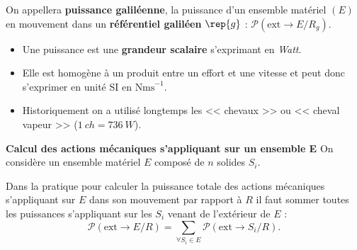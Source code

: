 \begin{remarque}%
On appellera \textbf{puissance galiléenne}, la puissance d'un ensemble matériel $(E)$ en mouvement dans un \textbf{référentiel galiléen} $\rep{g}$ : 
$
\mathcal{P}(\text{ext} \rightarrow E/R_g)
$.
\end{remarque}%


\begin{marginfigure}[-5cm]
\begin{itemize}
\item Une puissance est une \textbf{grandeur scalaire} s'exprimant en \textit{Watt}.
\item Elle est homogène à un produit entre un effort et une vitesse et peut donc s'exprimer en unité SI en $\text{Nms}^{-1}$.
\item Historiquement on a utilisé longtemps les << chevaux >> ou << cheval vapeur >> ($\SI{1}{ch}= \SI{736}{W}$).
\end{itemize}
\end{marginfigure}

\begin{prop}\textbf{Calcul des actions mécaniques s'appliquant sur un ensemble E}
On considère un ensemble matériel $E$ composé de $n$ solides $S_i$. 

Dans la pratique pour calculer la puissance totale des actions mécaniques s'appliquant sur $E$ dans son mouvement par rapport à $R$ il faut sommer toutes les puissances s'appliquant sur les $S_i$ venant de l'extérieur de $E$ :
$$
\mathcal{P}(\text{ext} \rightarrow E/R)=\displaystyle{\sum_{\forall S_i \in E}\mathcal{P}(\text{ext} \rightarrow S_i/R)}.
$$
\end{prop}

%
%
%

